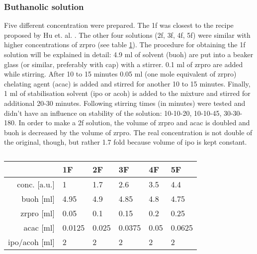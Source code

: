 \documentclass[a4paper]{article}
\newcommand{\td}[1]{\textbf{\textcolor{red}{#1}}}
\newcommand{\ds}[1]{}
\begin{document}
\subsubsection{Buthanolic solution}
\label{sec:sol}
Five different concentration were prepared. 
The \gls{1f}
was closest to the recipe proposed by Hu et. al. \cite{Hu2016}. 
The other four solutions (\gls{2f}, \gls{3f}, \gls{4f}, \gls{5f}) were similar with higher concentrations of \gls{zrpro} (see table \ref{tab:rec2}).
The procedure for obtaining the \gls{1f} solution will be explained in detail:
%
4.9 ml of solvent (\gls{buoh}) are put into a beaker glass (or similar, preferably with cap) with a stirrer. 
0.1 ml of \gls{zrpro} are added while stirring.  
After 10 to 15 minutes 0.05 ml (\ds{approximately }one mole equivalent of \gls{zrpro}) chelating agent (\gls{acac}) is added and stirred for another 10 to 15 minutes. 
Finally, 1 ml of stabilisation solvent (\gls{ipo} or \gls{acoh}) is added to the mixture and stirred for additional 20-30 minutes. 
Following stirring times (in minutes) were tested and didn't have an influence on stability of the solution: 10-10-20, 10-10-45, 30-30-180. 
In order to make a 
\gls{2f}
solution, the volume of \gls{zrpro} and \gls{acac} is doubled and \gls{buoh} is decreased by the volume of \gls{zrpro}. 
The real concentration is not double of the original, though, but rather 1.7 fold because volume of \gls{ipo} is kept constant.

\begin{table}[h]
	\centering
	\caption{}
	\label{tab:rec2}
	\begin{tabular}{rlllll}
		\hline
				&1F		&2F		&3F		&4F		&5F		\\
		\hline
		conc. [a.u.]	&1		&1.7	&2.6	&3.5	&4.4	\\
		\hline
		\gls{buoh} [ml]		&4.95	&4.9	&4.85	&4.8	&4.75	\\
		\gls{zrpro} [ml]	&0.05	&0.1	&0.15	&0.2	&0.25	\\
		\gls{acac} [ml]		&0.0125	&0.025	&0.0375	&0.05	&0.0625	\\
		\gls{ipo}/\gls{acoh} [ml]		&2		&2		&2		&2		&2		\\
		\hline
	\end{tabular}
\end{table}
\end{document}
